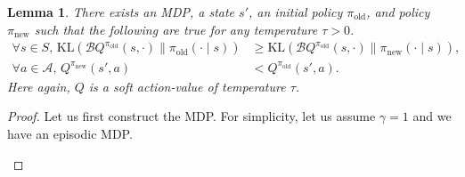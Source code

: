 \documentclass{article}
\newcommand{\actionspace}{\mathcal{A}}
\newcommand{\KL}{\mathrm{KL}}
\newcommand{\boltzmannQ}{\mathcal{B}Q}
\newcommand{\piold}{{\pi_\mathrm{old}}}
\newcommand{\pinew}{{\pi_\mathrm{new}}}
\newtheorem{lemma}{Lemma}
\begin{document}
\begin{lemma}\label{lem:forward-kl-counterexample}
There exists an MDP, a state $s'$, an initial policy $\piold$, and policy $\pinew$ such that the following are true for any temperature $\tau > 0$.
\begin{align}
    \forall s \in S,\, \KL(\boltzmannQ^\piold(s, \cdot) \parallel \piold(\cdot \mid s)) &\geq \KL(\boltzmannQ^\piold(s, \cdot) \parallel \pinew(\cdot \mid s)),\\
    \forall a \in \actionspace, \, Q^\pinew(s', a) &< Q^\piold(s', a).
\end{align}
Here again, $Q$ is a soft action-value of temperature $\tau$. 
\end{lemma}
\begin{proof}
Let us first construct the MDP. For simplicity, let us assume $\gamma = 1$ and we have an episodic MDP. 

\begin{center}
\end{center}
%


\end{proof}
\end{document}

